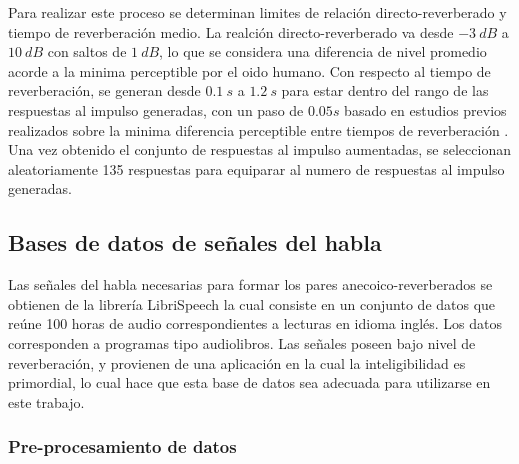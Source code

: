 Para realizar este proceso se determinan limites de relación directo-reverberado y tiempo de reverberación medio. La realción directo-reverberado va desde $-3 \ dB$ a $10 \ dB$ con saltos de $1 \ dB$, lo que se considera una diferencia de nivel promedio acorde a la minima perceptible por el oido humano. Con respecto al tiempo de reverberación, se generan desde $0.1 \ s$ a $1.2 \ s$ para estar dentro del rango de las respuestas al impulso generadas, con un paso de $0.05 s$ basado en estudios previos realizados sobre la minima diferencia perceptible entre tiempos de reverberación \cite{aug_JND}. Una vez obtenido el conjunto de respuestas al impulso aumentadas, se seleccionan aleatoriamente 135 respuestas para equiparar al numero de respuestas al impulso generadas. 

\subsection{Bases de datos de señales del habla}

Las señales del habla necesarias para formar los pares anecoico-reverberados se obtienen de la librería LibriSpeech \cite{librispeech} la cual consiste en un conjunto de datos que reúne 100 horas de audio correspondientes a lecturas en idioma inglés. Los datos corresponden a programas tipo audiolibros. Las señales poseen bajo nivel de reverberación, y provienen de una aplicación en la cual la inteligibilidad es primordial, lo cual hace que esta base de datos sea adecuada para utilizarse en este trabajo.

\subsubsection{Pre-procesamiento de datos}

